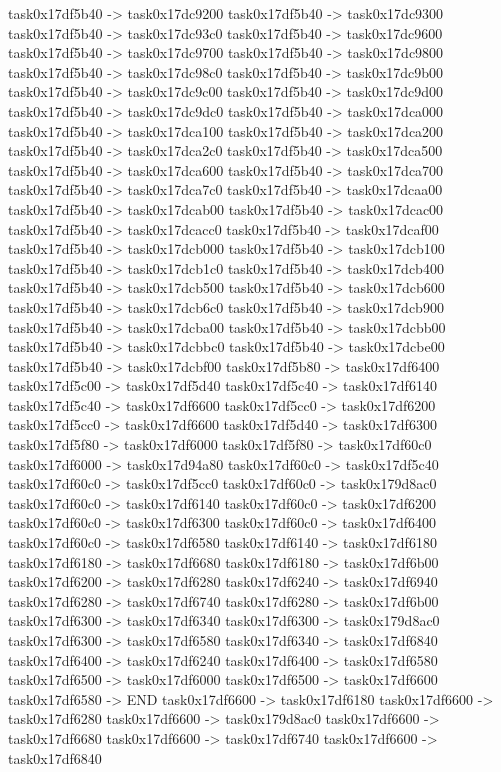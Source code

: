 {	task0x17df5b40 -> task0x17dc9200
	task0x17df5b40 -> task0x17dc9300
	task0x17df5b40 -> task0x17dc93c0
	task0x17df5b40 -> task0x17dc9600
	task0x17df5b40 -> task0x17dc9700
	task0x17df5b40 -> task0x17dc9800
	task0x17df5b40 -> task0x17dc98c0
	task0x17df5b40 -> task0x17dc9b00
	task0x17df5b40 -> task0x17dc9c00
	task0x17df5b40 -> task0x17dc9d00
	task0x17df5b40 -> task0x17dc9dc0
	task0x17df5b40 -> task0x17dca000
	task0x17df5b40 -> task0x17dca100
	task0x17df5b40 -> task0x17dca200
	task0x17df5b40 -> task0x17dca2c0
	task0x17df5b40 -> task0x17dca500
	task0x17df5b40 -> task0x17dca600
	task0x17df5b40 -> task0x17dca700
	task0x17df5b40 -> task0x17dca7c0
	task0x17df5b40 -> task0x17dcaa00
	task0x17df5b40 -> task0x17dcab00
	task0x17df5b40 -> task0x17dcac00
	task0x17df5b40 -> task0x17dcacc0
	task0x17df5b40 -> task0x17dcaf00
	task0x17df5b40 -> task0x17dcb000
	task0x17df5b40 -> task0x17dcb100
	task0x17df5b40 -> task0x17dcb1c0
	task0x17df5b40 -> task0x17dcb400
	task0x17df5b40 -> task0x17dcb500
	task0x17df5b40 -> task0x17dcb600
	task0x17df5b40 -> task0x17dcb6c0
	task0x17df5b40 -> task0x17dcb900
	task0x17df5b40 -> task0x17dcba00
	task0x17df5b40 -> task0x17dcbb00
	task0x17df5b40 -> task0x17dcbbc0
	task0x17df5b40 -> task0x17dcbe00
	task0x17df5b40 -> task0x17dcbf00
	task0x17df5b80 -> task0x17df6400
	task0x17df5c00 -> task0x17df5d40
	task0x17df5c40 -> task0x17df6140
	task0x17df5c40 -> task0x17df6600
	task0x17df5cc0 -> task0x17df6200
	task0x17df5cc0 -> task0x17df6600
	task0x17df5d40 -> task0x17df6300
	task0x17df5f80 -> task0x17df6000
	task0x17df5f80 -> task0x17df60c0
	task0x17df6000 -> task0x17d94a80
	task0x17df60c0 -> task0x17df5c40
	task0x17df60c0 -> task0x17df5cc0
	task0x17df60c0 -> task0x179d8ac0
	task0x17df60c0 -> task0x17df6140
	task0x17df60c0 -> task0x17df6200
	task0x17df60c0 -> task0x17df6300
	task0x17df60c0 -> task0x17df6400
	task0x17df60c0 -> task0x17df6580
	task0x17df6140 -> task0x17df6180
	task0x17df6180 -> task0x17df6680
	task0x17df6180 -> task0x17df6b00
	task0x17df6200 -> task0x17df6280
	task0x17df6240 -> task0x17df6940
	task0x17df6280 -> task0x17df6740
	task0x17df6280 -> task0x17df6b00
	task0x17df6300 -> task0x17df6340
	task0x17df6300 -> task0x179d8ac0
	task0x17df6300 -> task0x17df6580
	task0x17df6340 -> task0x17df6840
	task0x17df6400 -> task0x17df6240
	task0x17df6400 -> task0x17df6580
	task0x17df6500 -> task0x17df6000
	task0x17df6500 -> task0x17df6600
	task0x17df6580 -> END
	task0x17df6600 -> task0x17df6180
	task0x17df6600 -> task0x17df6280
	task0x17df6600 -> task0x179d8ac0
	task0x17df6600 -> task0x17df6680
	task0x17df6600 -> task0x17df6740
	task0x17df6600 -> task0x17df6840
}
